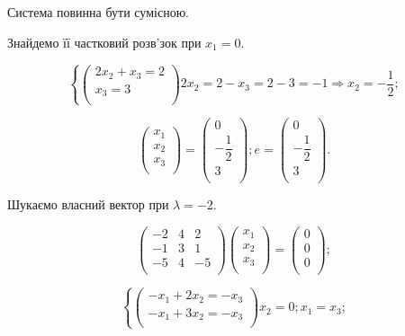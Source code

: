 Система повинна бути сумісною.

Знайдемо її частковий розв’зок при $x_1 = 0$.

$$\left\{ \begin{pmatrix}
	2x_2 + x_3 = 2 \\
	x_3 = 3 \\
\end{pmatrix} \right. 2 x_2 = 2 - x_3 = 2 - 3 = -1 \Rightarrow x_2 = -\dfrac{1}{2};$$

$$\begin{pmatrix}
	x_1 \\
	x_2 \\
	x_3 \\
\end{pmatrix} = \begin{pmatrix}
	0 \\
	-\dfrac{1}{2} \\
	3 \\
\end{pmatrix}; e = \begin{pmatrix}
	0 \\
	-\dfrac{1}{2} \\
	3 \\
\end{pmatrix}.$$

Шукаємо власний вектор при $\lambda = -2$.

$$\begin{pmatrix}
	-2 & 4 & 2 \\
	-1 & 3 & 1 \\
	-5 & 4 & -5 \\
\end{pmatrix} \begin{pmatrix}
	x_1 \\
	x_2 \\
	x_3 \\
\end{pmatrix} = \begin{pmatrix}
	0 \\
	0 \\
	0 \\
\end{pmatrix};$$

$$\left\{ \begin{pmatrix}
	-x_1 + 2x_2 = -x_3 \\
	-x_1 + 3x_2 = -x_3 \\
\end{pmatrix} \right. x_2 = 0; x_1 = x_3;$$

